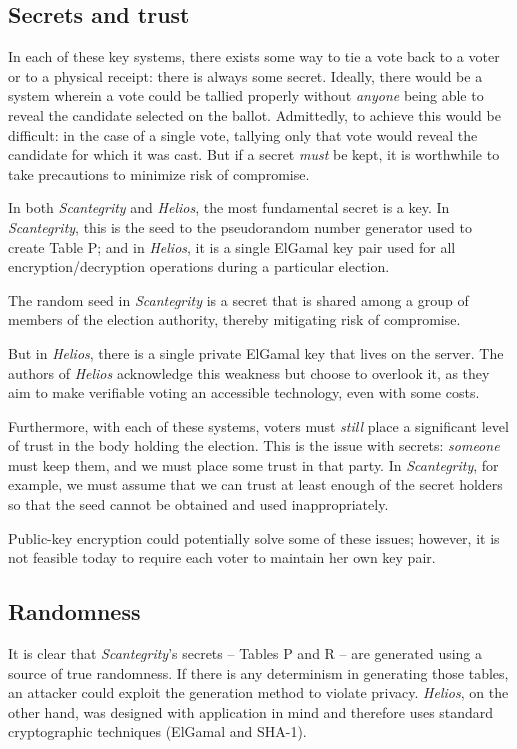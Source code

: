 \documentclass[10pt,twocolumn]{article}
\newcommand{\term}[1]{\textit{#1}}
\begin{document}
\subsection{Secrets and trust}

In each of these key systems, there exists some way to tie a vote back to a voter or to a physical
receipt: there is always some secret. Ideally, there would be a system wherein a vote could be
tallied properly without \emph{anyone} being able to reveal the candidate selected on the ballot.
Admittedly, to achieve this would be difficult: in the case of a single vote, tallying only that vote
would reveal the candidate for which it was cast. But if a secret \emph{must} be kept, it is
worthwhile to take precautions to minimize risk of compromise.

In both \term{Scantegrity} and \term{Helios}, the most fundamental secret is a key. In \term{Scantegrity}, this is the
seed to the pseudorandom number generator used to create Table P; and in \term{Helios}, it is a single
ElGamal key pair used for all encryption/decryption operations during a particular election.

The random seed in \term{Scantegrity} is a secret that is shared among a group of members of the election
authority, thereby mitigating risk of compromise.

But in \term{Helios}, there is a single private ElGamal key that lives on the server. The
authors of \term{Helios} acknowledge this weakness but choose to overlook it, as they aim to make
verifiable voting an accessible technology, even with some costs.

Furthermore, with each of these systems, voters must \emph{still} place a significant level of trust
in the body holding the election. This is the issue with secrets: \emph{someone} must keep them, and
we must place some trust in that party. In \term{Scantegrity}, for example, we must assume that we can
trust at least enough of the secret holders so that the seed cannot be obtained and used
inappropriately.

Public-key encryption could potentially solve some of these issues; however, it is not feasible
today to require each voter to maintain her own key pair.

\subsection{Randomness}

It is clear that \term{Scantegrity}'s secrets -- Tables P and R -- are generated using a source of true
randomness. If there is any determinism in generating those tables, an attacker could exploit the
generation method to violate privacy. \term{Helios}, on the other hand, was designed with application in
mind and therefore uses standard cryptographic techniques (ElGamal and SHA-1).
\end{document}

